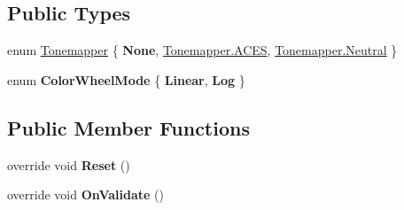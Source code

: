 \subsection*{Public Types}
\begin{DoxyCompactItemize}
\item 
enum \mbox{\hyperlink{class_unity_engine_1_1_post_processing_1_1_color_grading_model_a4955bb9dfed7e27c93e7493ff66f3de6}{Tonemapper}} \{ {\bfseries None}, 
\mbox{\hyperlink{class_unity_engine_1_1_post_processing_1_1_color_grading_model_a4955bb9dfed7e27c93e7493ff66f3de6a01ec90d9624dce53f3f3492882841fe6}{Tonemapper.\+A\+C\+ES}}, 
\mbox{\hyperlink{class_unity_engine_1_1_post_processing_1_1_color_grading_model_a4955bb9dfed7e27c93e7493ff66f3de6ae9bb5320b3890b6747c91b5a71ae5a01}{Tonemapper.\+Neutral}}
 \}
\item 
\mbox{\label{class_unity_engine_1_1_post_processing_1_1_color_grading_model_a57da7f62b07b7109f15758571a852586}} 
enum {\bfseries Color\+Wheel\+Mode} \{ {\bfseries Linear}, 
{\bfseries Log}
 \}
\end{DoxyCompactItemize}
\subsection*{Public Member Functions}
\begin{DoxyCompactItemize}
\item 
\mbox{\label{class_unity_engine_1_1_post_processing_1_1_color_grading_model_a64a6bc1783ee8f2f66e4eb6c13385eed}} 
override void {\bfseries Reset} ()
\item 
\mbox{\label{class_unity_engine_1_1_post_processing_1_1_color_grading_model_a2cdf5183a4882e9ae3439b22fe935f12}} 
override void {\bfseries On\+Validate} ()
\end{DoxyCompactItemize}
